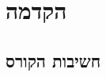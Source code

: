 \documentclass[]{article}
\begin{document}
	\def\lecnum{1}
	\def\insert#1{} %
	

\section*{הקדמה}
\insert{introduction}
	\subsection*{חשיבות הקורס}
	
\end{document}
